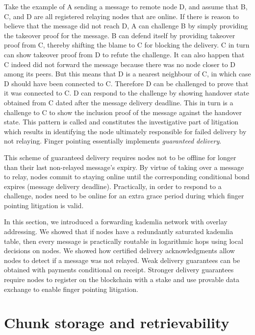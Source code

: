 Take the example of A sending a message to remote node D, and assume that B, C, and D are all registered relaying nodes that are online. If there is reason to believe that the message did not reach D, A can challenge B by simply providing the takeover proof for the message. B can defend itself by providing takeover proof from C, thereby shifting the blame to C for blocking the delivery. C in turn can show takeover proof from D to refute the challenge. It can also happen that C indeed did not forward the message because there was no node closer to D among its peers. But this means that D is a nearest neighbour of C, in which case D should have been connected to C.
Therefore D can be challenged to prove that it was connected to C. D can respond to the challenge
by showing handover state obtained from C dated after the message delivery deadline. This in turn is
a challenge to C to show the inclusion proof of the message against the handover state.
This pattern is called  and constitutes the investigative part of litigation which results in identifying the node ultimately responsible for failed delivery by not relaying. Finger pointing essentially implements \emph{guaranteed delivery}.

This scheme of guaranteed delivery requires nodes not to be offline for longer than their last non-relayed message's expiry. 
By virtue of taking over a message to relay, nodes commit to staying online until the corresponding conditional bond expires (message delivery deadline). 
Practically, in order to respond to a challenge, nodes need to be online for an extra grace period during which finger pointing litigation is valid. 

In this section, we introduced a forwarding kademlia network with overlay addressing. We showed that if nodes have a redundantly saturated kademlia table, then every message is practically routable in logarithmic hops using local decisions on nodes.
We showed how certified delivery acknowledgments allow nodes to detect if a message was not relayed. Weak delivery guarantees can be obtained with payments conditional on receipt. Stronger delivery guarantees require nodes to register on the blockchain with a stake and use provable data exchange to enable finger pointing litigation. 

\section{Chunk storage and retrievability}

